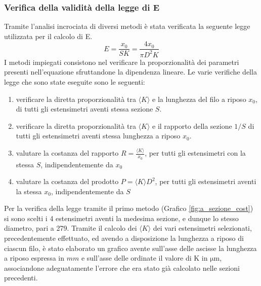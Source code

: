 \documentclass[a4paper,11pt,oneside]{article}
\begin{document}
\subsubsection*{Verifica della validità della legge di E}
Tramite l'analisi incrociata di diversi metodi è stata verificata la seguente legge utilizzata per il calcolo di E.
\begin{equation*}
    E=\frac{x_0}{S K}=\frac{4 x_0}{\pi D^{2}K}
    \label{equation:legge_e}
\end{equation*}
I metodi impiegati consistono nel verificare la proporzionalità dei parametri presenti nell'equazione sfruttandone la dipendenza lineare. Le varie verifiche della legge che sono state eseguite sono le seguenti:
\begin{enumerate}
    \item verificare la diretta proporzionalità tra $\langle K \rangle$ e la lunghezza del filo a riposo $x_0$, di tutti gli estensimetri aventi stessa sezione $S$.
    \item verificare la diretta proporzionalità tra $\langle K \rangle$ e il rapporto della sezione $1/S$ di tutti gli estensimetri aventi stessa lunghezza a riposo $x_{0}$.
    \item valutare la costanza del rapporto $R=\frac{\langle K \rangle}{x_{0}}$, per tutti gli estensimetri con la stessa $S$, indipendentemente da $x_{0}$
    \item valutare la costanza del prodotto $P={ \langle K \rangle} D^2 $, per tutti gli estensimetri aventi la stessa $x_{0}$, indipendentemente da $S$
\end{enumerate}

Per la verifica della legge tramite il primo metodo (Grafico \ref{fig:a_sezione_cost}) si sono scelti i 4  estensimetri aventi la medesima sezione, e dunque lo stesso diametro, pari a \SI{279}{\micron}. Tramite il calcolo dei $\langle K \rangle$ dei vari estensimetri selezionati, precedentemente effettuato, ed avendo a disposizione la lunghezza a riposo di ciascun filo, è stato elaborato un grafico avente sull'asse delle ascisse la lunghezza a riposo espressa in $mm$ e sull'asse delle ordinate il valore di K in $\si{\micro\meter}$, associandone adeguatamente l'errore che era stato già calcolato nelle sezioni precedenti.
\end{document}
